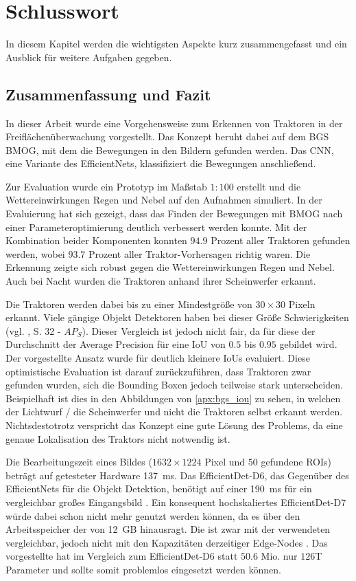 \chapter{Schlusswort} \label{ch:final}
In diesem Kapitel werden die wichtigsten Aspekte kurz zusammengefasst und ein Ausblick für weitere Aufgaben gegeben.

\section{Zusammenfassung und Fazit}
In dieser Arbeit wurde eine Vorgehensweise zum Erkennen von Traktoren in der Freiflächenüberwachung vorgestellt.
Das Konzept beruht dabei auf dem \ac{BGS} \ac{BMOG}, mit dem die Bewegungen in den Bildern gefunden werden.
Das \ac{CNN}, eine Variante des EfficientNets, klassifiziert die Bewegungen anschließend.

Zur Evaluation wurde ein Prototyp im Maßstab $1:100$ erstellt und die Wetter\-einwirkungen Regen und Nebel auf den Aufnahmen simuliert.
In der Evaluierung hat sich gezeigt, dass das Finden der Bewegungen mit \ac{BMOG} nach einer Parameteroptimierung deutlich verbessert werden konnte.
Mit der Kombination beider Komponenten konnten $94.9$ Prozent aller Traktoren gefunden werden, wobei $93.7$ Prozent aller Traktor-Vorhersagen richtig waren.
Die Erkennung zeigte sich robust gegen die Wettereinwirkungen Regen und Nebel.
Auch bei Nacht wurden die Traktoren anhand ihrer Scheinwerfer erkannt.

Die Traktoren werden dabei bis zu einer Mindestgröße von \mbox{$30 \times 30$} Pixeln erkannt.
Viele gängige Objekt Detektoren haben bei dieser Größe Schwierigkeiten (vgl. \cite{wu_recent_2019}, S. 32 - $AP_S$).
Dieser Vergleich ist jedoch nicht fair, da für diese der Durchschnitt der Average Precision für eine \ac{IoU} von $0.5$ bis $0.95$ gebildet wird.
Der vorgestellte Ansatz wurde für deutlich kleinere \acp{IoU} evaluiert.
Diese optimistische Evaluation ist darauf zurückzuführen, dass Traktoren zwar gefunden wurden, sich die Bounding Boxen jedoch teilweise stark unterscheiden.
Beispielhaft ist dies in den Abbildungen von \autoref{apx:bgs_iou} zu sehen, in welchen der Lichtwurf / die Scheinwerfer und nicht die Traktoren selbst erkannt werden.
Nichtsdestotrotz verspricht das Konzept eine gute Lösung des Problems, da eine genaue Lokalisation des Traktors nicht notwendig ist.

Die Bearbeitungszeit eines Bildes ($1632 \times 1224$ Pixel und $50$ gefundene \acp{ROI}) beträgt auf getesteter Hardware \SI{137}{ms}.
Das EfficientDet-D6, das Gegenüber des EfficientNets für die Objekt Detektion, benötigt auf einer  \SI{190}{ms} für ein vergleichbar großes Eingangsbild \cite{tan_efficientdet_2019}.
Ein konsequent hochskaliertes EfficientDet-D7 würde dabei schon nicht mehr genutzt werden können, da es über den Arbeitsspeicher der  von \SI{12}{GB} hinausragt.
Die  ist zwar mit der verwendeten  vergleichbar, jedoch nicht mit den Kapazitäten derzeitiger Edge-Nodes \cite{lambda_labs_inc_gpu_nodate,nvidia_nvidia_nodate}.
Das vorgestellte  hat im Vergleich zum EfficientDet-D6 statt $50.6$ Mio. nur $126$T Parameter und sollte somit problemlos eingesetzt werden können.

